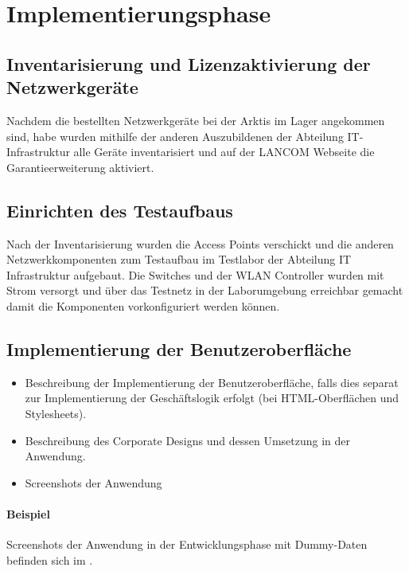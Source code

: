 \section{Implementierungsphase} 
\label{sec:Implementierungsphase}

\subsection{Inventarisierung und Lizenzaktivierung der Netzwerkgeräte}
\label{Inventarisierung und Lizenzaktivierung der Netzwerkgeräte}
Nachdem die bestellten Netzwerkgeräte bei der \ac{Arktis} im Lager angekommen sind, habe wurden mithilfe der anderen Auszubildenen der Abteilung IT-Infrastruktur alle Geräte inventarisiert und auf der LANCOM Webseite die Garantieerweiterung aktiviert. 

\subsection{Einrichten des Testaufbaus}
\label{sec:Einrichten des Testaufbaus}
Nach der Inventarisierung wurden die Access Points verschickt und die anderen Netzwerkkomponenten zum Testaufbau im Testlabor der Abteilung IT Infrastruktur aufgebaut. Die Switches und der WLAN Controller wurden mit Strom versorgt und über das Testnetz in der Laborumgebung erreichbar gemacht damit die Komponenten vorkonfiguriert werden können.


\subsection{Implementierung der Benutzeroberfläche}
\label{sec:ImplementierungBenutzeroberflaeche}

\begin{itemize}
	\item Beschreibung der Implementierung der Benutzeroberfläche, falls dies separat zur Implementierung der Geschäftslogik erfolgt (\zB bei \ac{HTML}-Oberflächen und Stylesheets).
	\item \Ggfs Beschreibung des Corporate Designs und dessen Umsetzung in der Anwendung.
	\item Screenshots der Anwendung
\end{itemize}

\paragraph{Beispiel}
Screenshots der Anwendung in der Entwicklungsphase mit Dummy-Daten befinden sich im .


